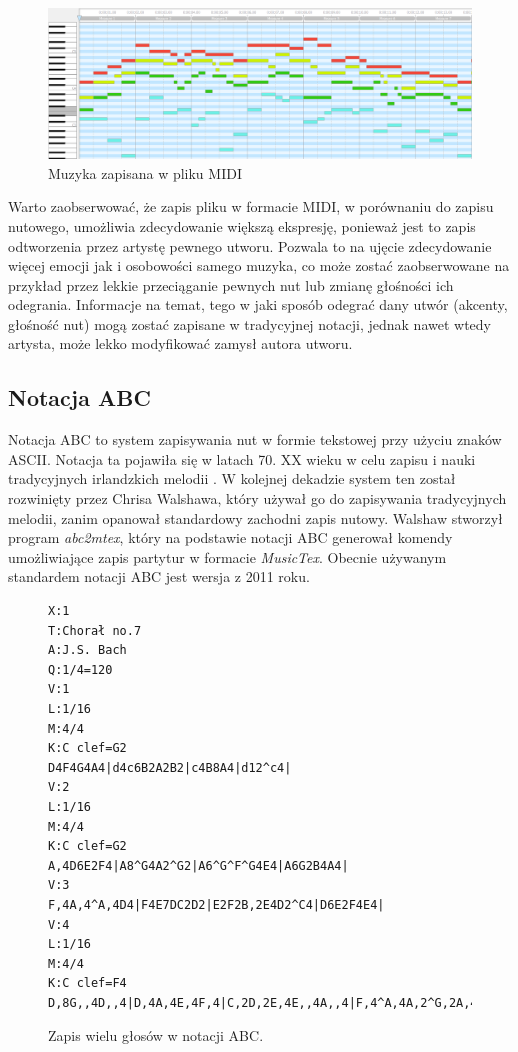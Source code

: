 \documentclass[data-science]{agh-wi} %
\begin{document}
\begin{figure}[ht!]
    \begin{center}
        \includegraphics*[width=\linewidth]{./img/piano_roll.png}
    \end{center}
    \caption{Muzyka zapisana w pliku MIDI}\label{fig:jsb_pianoroll}
\end{figure}

Warto zaobserwować, że zapis pliku w formacie MIDI, w porównaniu do zapisu nutowego, umożliwia zdecydowanie większą ekspresję, ponieważ jest to zapis odtworzenia przez artystę pewnego utworu. Pozwala to na ujęcie zdecydowanie więcej emocji jak i osobowości samego muzyka, co może zostać zaobserwowane na przykład przez lekkie przeciąganie pewnych nut lub zmianę głośności ich odegrania. Informacje na temat, tego w jaki sposób odegrać dany utwór (akcenty, głośność nut) mogą zostać zapisane w tradycyjnej notacji, jednak nawet wtedy artysta, może lekko modyfikować zamysł autora utworu.

\subsection{Notacja ABC}
Notacja ABC to system zapisywania nut w formie tekstowej przy użyciu znaków ASCII. Notacja ta pojawiła się w latach 70. XX wieku w celu zapisu i nauki tradycyjnych irlandzkich melodii \cite{abc_history}. W kolejnej dekadzie system ten został rozwinięty przez Chrisa Walshawa, który używał go do zapisywania tradycyjnych melodii, zanim opanował standardowy zachodni zapis nutowy. Walshaw stworzył program \textit{abc2mtex}, który na podstawie notacji ABC generował komendy umożliwiające zapis partytur w formacie \textit{MusicTex}. Obecnie używanym standardem notacji ABC jest wersja z 2011 roku.

\begin{figure}[ht!]
    \begin{verbatim}
X:1
T:Chorał no.7
A:J.S. Bach
Q:1/4=120
V:1
L:1/16
M:4/4
K:C clef=G2
D4F4G4A4|d4c6B2A2B2|c4B8A4|d12^c4|
V:2
L:1/16
M:4/4
K:C clef=G2
A,4D6E2F4|A8^G4A2^G2|A6^G^F^G4E4|A6G2B4A4|
V:3
F,4A,4^A,4D4|F4E7DC2D2|E2F2B,2E4D2^C4|D6E2F4E4|
V:4
L:1/16
M:4/4
K:C clef=F4
D,8G,,4D,,4|D,4A,4E,4F,4|C,2D,2E,4E,,4A,,4|F,4^A,4A,2^G,2A,4|        
\end{verbatim}
    \caption{Zapis wielu głosów w notacji ABC.}\label{fig:abc_polyphony}
\end{figure}
\end{document}
